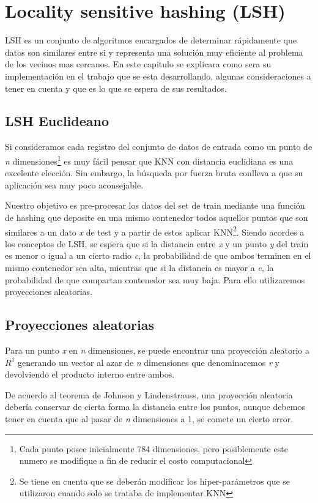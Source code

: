\chapter{Locality sensitive hashing (LSH)}
LSH es un conjunto de algoritmos encargados de determinar rápidamente que datos son similares entre si y representa una solución muy eficiente al problema de los vecinos mas cercanos. En este capitulo se explicara como sera su implementación en el trabajo que se esta desarrollando, algunas consideraciones a tener en cuenta y que es lo que se espera de sus resultados.

\section{LSH Euclideano}
Si consideramos cada registro del conjunto de datos de entrada como un punto de \textit{n} dimensiones\footnote{Cada punto posee inicialmente 784 dimensiones, pero posiblemente este numero se modifique a fin de reducir el costo computacional} es muy fácil pensar que KNN con distancia euclidiana es una excelente elección. Sin embargo, la búsqueda por fuerza bruta conlleva a que su aplicación sea muy poco aconsejable. 

Nuestro objetivo es pre-procesar los datos del set de train mediante una función de hashing que deposite en una mismo contenedor todos aquellos puntos que son similares a un dato \textit{x} de test y a partir de estos aplicar KNN\footnote{Se tiene en cuenta que se deberán modificar los hiper-parámetros que se utilizaron cuando solo se trataba de implementar KNN}. Siendo acordes a los conceptos de LSH, se espera que si la distancia entre \textit{x} y un punto \textit{y} del train es menor o igual a un cierto radio \textit{c}, la probabilidad de que ambos terminen en el mismo contenedor sea alta, mientras que si la distancia es mayor a \textit{c}, la probabilidad de que compartan contenedor sea muy baja. Para ello utilizaremos proyecciones aleatorias.

\section{Proyecciones aleatorias}
Para un punto \textit{x} en \textit{n} dimensiones, se puede encontrar una proyección aleatorio a $ R^{1} $ generando un vector al azar de \textit{n} dimensiones que denominaremos \textit{r} y devolviendo el producto interno entre ambos.

De acuerdo al teorema de Johnson y Lindenstrauss, una proyección aleatoria debería conservar de cierta forma la distancia entre los puntos, aunque debemos tener en cuenta que al pasar de \textit{n} dimensiones a 1, se comete un cierto error.

